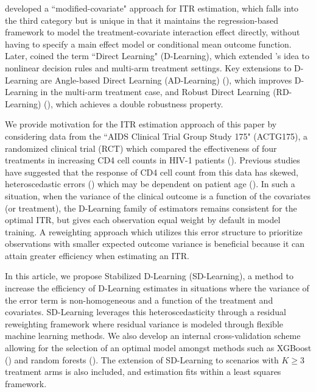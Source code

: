 \documentclass[useAMS,usenatbib]{biom}
\begin{document}
\cite{tian_simple_2014} developed a ``modified-covariate" approach for ITR estimation, which falls into the third category but is unique in that it maintains the regression-based framework to model the treatment-covariate interaction effect directly, without having to specify a main effect model or conditional mean outcome function. Later, \cite{qi_d-learning_2018} coined the term ``Direct Learning" (D-Learning), which extended \cite{tian_simple_2014}'s idea to nonlinear decision rules and multi-arm treatment settings. Key extensions to D-Learning are Angle-based Direct Learning (AD-Learning) (\cite{qi_multi-armed_2020}), which improves D-Learning in the multi-arm treatment case, and Robust Direct Learning (RD-Learning) (\cite{meng_doubly_2021}),  which achieves a double robustness property.

We provide motivation for the ITR estimation approach of this paper by considering data from the ``AIDS Clinical Trial Group Study 175" (ACTG175), a randomized clinical trial (RCT) which compared the effectiveness of four treatments in increasing CD4 cell counts in HIV-1 patients (\cite{hammer_trial_1996}). Previous studies have suggested that the response of CD4 cell count from this data has skewed, heteroscedastic errors (\cite{zhang_robust_2021}) which may be dependent on patient age (\cite{xiao_robust_2019}). In such a situation, when the variance of the clinical outcome is a function of the covariates (or treatment), the D-Learning family of estimators remains consistent for the optimal ITR, but gives each observation equal weight by default in model training. A reweighting approach which utilizes this error structure to prioritize observations with smaller expected outcome variance is beneficial because it can attain greater efficiency when estimating an ITR.

In this article, we propose Stabilized D-Learning (SD-Learning), a method to increase the efficiency of D-Learning estimates in situations where the variance of the error term is non-homogeneous and a function of the treatment and covariates. SD-Learning leverages this heteroscedasticity through a residual reweighting framework where residual variance is modeled through flexible machine learning methods. We also develop an internal cross-validation scheme allowing for the selection of an optimal model amongst methods such as XGBoost (\cite{chen_xgboost_2016}) and random forests (\cite{breiman_random_2001}). The extension of SD-Learning to scenarios with $K \geq 3$ treatment arms is also included, and estimation fits within a least squares framework.
\end{document}
